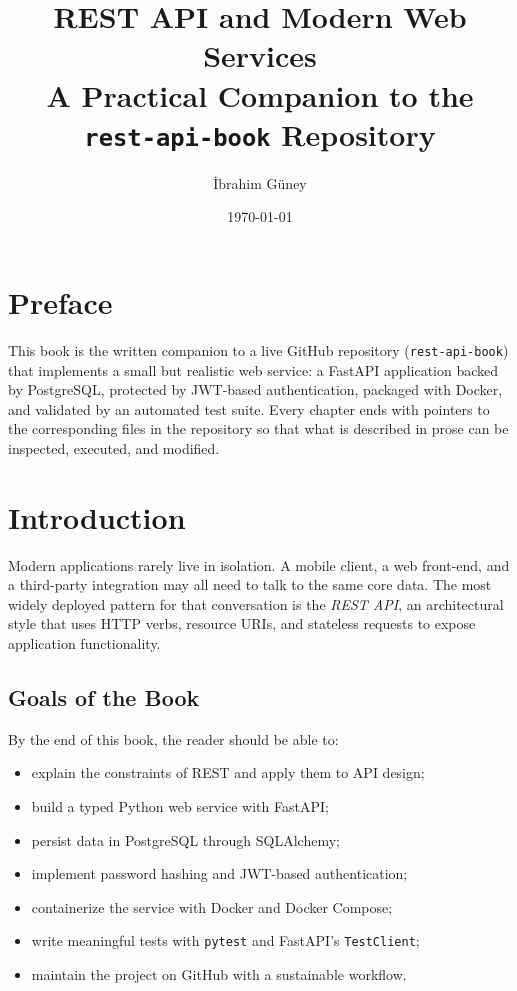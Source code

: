 \documentclass[11pt]{book}
\title{REST API and Modern Web Services\\
\large A Practical Companion to the \texttt{rest-api-book} Repository}
\author{İbrahim Güney}
\date{\today}
\begin{document}
\frontmatter
\maketitle

\tableofcontents

\chapter*{Preface}

This book is the written companion to a live GitHub repository
(\texttt{rest-api-book}) that implements a small but realistic web service:
a FastAPI application backed by PostgreSQL, protected by JWT-based
authentication, packaged with Docker, and validated by an automated test
suite. Every chapter ends with pointers to the corresponding files in the
repository so that what is described in prose can be inspected, executed,
and modified.

\mainmatter

\chapter{Introduction}
\label{ch:intro}

Modern applications rarely live in isolation. A mobile client, a web
front-end, and a third-party integration may all need to talk to the same
core data. The most widely deployed pattern for that conversation is the
\emph{REST API}, an architectural style that uses HTTP verbs, resource
URIs, and stateless requests to expose application functionality.

\section{Goals of the Book}
By the end of this book, the reader should be able to:
\begin{itemize}[leftmargin=*]
  \item explain the constraints of REST and apply them to API design;
  \item build a typed Python web service with FastAPI;
  \item persist data in PostgreSQL through SQLAlchemy;
  \item implement password hashing and JWT-based authentication;
  \item containerize the service with Docker and Docker Compose;
  \item write meaningful tests with \texttt{pytest} and FastAPI's
        \texttt{TestClient};
  \item maintain the project on GitHub with a sustainable workflow.
\end{itemize}
\end{document}
